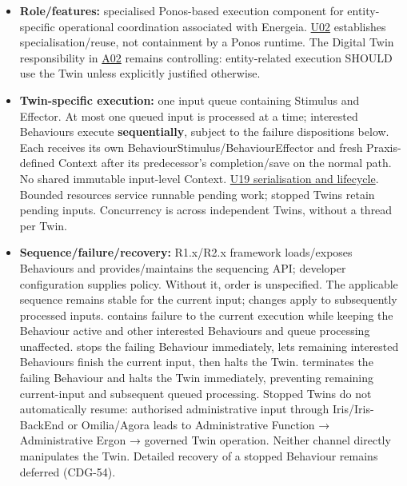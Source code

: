 \begin{itemize}


\item \textbf{Role/features:} specialised Ponos-based execution component for entity-specific
  operational coordination associated with Energeia. \href{\detokenize{../../../../../docs/markdown/05-information-systems-architecture/sources.md#u02}}{U02} establishes
  specialisation/reuse, not containment by a Ponos runtime. The Digital Twin
  responsibility in \href{\detokenize{../../../../../docs/markdown/05-information-systems-architecture/sources.md#a02}}{A02} remains controlling: entity-related
  execution SHOULD use the Twin unless explicitly justified otherwise.

\item \textbf{Twin-specific execution:} one input queue containing Stimulus and Effector.
  At most one queued input is processed at a time; interested Behaviours execute
  \textbf{sequentially}, subject to the failure dispositions below. Each receives its
  own BehaviourStimulus/BehaviourEffector and fresh Praxis-defined Context after
  its predecessor's completion/save on the normal path. No shared immutable
  input-level Context.
  \href{\detokenize{../../../../../docs/markdown/05-information-systems-architecture/design-notes/DesignNote-Digital-Twin-Behaviour-and-Execution-Semantics.md}}{U19 serialisation and lifecycle}.
  Bounded resources service runnable pending work; stopped Twins retain pending
  inputs. Concurrency is across independent Twins, without a thread per Twin.

\item \textbf{Sequence/failure/recovery:} R1.x/R2.x framework loads/exposes Behaviours and
  provides/maintains the sequencing API; developer configuration supplies policy.
  Without it, order is unspecified. The applicable sequence remains stable for
  the current input; changes apply to subsequently processed inputs.
  \texttt{} contains failure to the current execution while
  keeping the Behaviour active and other interested Behaviours and queue processing
  unaffected. \texttt{} stops the failing Behaviour immediately,
  lets remaining interested Behaviours finish the current input, then halts the
  Twin. \texttt{} terminates the failing Behaviour and halts the
  Twin immediately, preventing remaining current-input and subsequent queued
  processing. Stopped Twins do not
  automatically resume: authorised administrative input through Iris/Iris-BackEnd
  or Omilia/Agora leads to Administrative Function → Administrative Ergon →
  governed Twin operation. Neither channel directly manipulates the Twin.
  Detailed recovery of a stopped Behaviour remains deferred (CDG-54).


\end{itemize}
